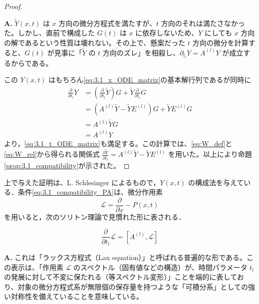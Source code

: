 \begin{proof}
\begin{Q}[$Y(x,t) = \tilde{Y}(x,t)G(t)$ とおくことで、なぜ所望の可逆行列解が構成できたと言えるのか？]
\textbf{A.} $\tilde{Y}(x,t)$ は $x$ 方向の微分方程式を満たすが、$t$ 方向のそれは満たさなかった。しかし、直前で構成した $G(t)$ は $x$ に依存しないため、$Y$ にしても $x$ 方向の解であるという性質は壊れない。その上で、懸案だった $t$ 方向の微分を計算すると、$G(t)$ が見事に「$\tilde{Y}$ の $t$ 方向のズレ」を相殺し、$\partial_{t_l}Y = A^{(l)}Y$ が成立するからである。
\end{Q}

この $Y(x,t)$ はもちろん\eqref{eq:3.1_x_ODE_matrix}の基本解行列であるが同時に
\begin{align*}
  \frac{\partial}{\partial t_l}Y 
  &= \left( \frac{\partial}{\partial t_l}\tilde{Y} \right)G + \tilde{Y}\frac{\partial}{\partial t_l}G \\[2mm]
  &= \left( A^{(l)}\tilde{Y} - \tilde{Y}E^{(l)} \right)G + \tilde{Y}E^{(l)}G \\[2mm]
  &= A^{(l)}\tilde{Y}G \\[2mm]
  &= A^{(l)}Y
\end{align*}
より，\eqref{eq:3.1_t_ODE_matrix}も満足する。この計算では、\eqref{eq:W_def}と\eqref{eq:W_rel}から得られる関係式 $\frac{\partial \tilde{Y}}{\partial t_l} = A^{(l)}\tilde{Y} - \tilde{Y}E^{(l)}$ を用いた。以上により命題\ref{prop:3.1_compatibility}が示された。
\end{proof}

上で与えた証明は、L. Schlesinger によるもので，$Y(x,t)$ の構成法を与えている．条件\eqref{eq:3.1_compatibility_PA}は、微分作用素
\[
  \mathcal{L} = \frac{\partial}{\partial x} - P(x,t)
\]
を用いると，次のソリトン理論で見慣れた形に表される．

\begin{equation}\label{eq:3.1_lax_equation}
  \frac{\partial}{\partial t_l}\mathcal{L} = [A^{(l)}, \mathcal{L}]
\end{equation}

\begin{Q}[微分作用素 $\mathcal{L}$ を用いて完全積分可能条件を $\frac{\partial \mathcal{L}}{\partial t_l} = {[}A^{(l)}, \mathcal{L}{]}$ と書くことの本質的な意義は何か？]
\textbf{A.} これは「ラックス方程式（Lax equation）」と呼ばれる普遍的な形である。この表示は、「作用素 $\mathcal{L}$ のスペクトル（固有値などの構造）が、時間パラメータ $t_l$ の発展に対して不変に保たれる（等スペクトル変形）」ことを端的に表しており、対象の微分方程式系が無限個の保存量を持つような「可積分系」としての強い対称性を備えていることを意味している。
\end{Q}

